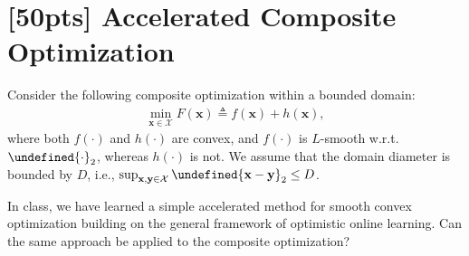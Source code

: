 \documentclass[a4paper]{article}
\numberwithin{equation}{section}
\theoremstyle{definition}
\theoremstyle{definition}
\def \X {\mathcal{X}}
\def \x {\textbf{x}}
\def \y {\textbf{y}}
\let\norm\undefined
\DeclarePairedDelimiter\norm{\lVert}{\rVert}
\begin{document}
\newpage
\section{[50pts] Accelerated Composite Optimization}

Consider the following composite optimization within a bounded domain:
\begin{align*}
  \min_{\x \in \X} F(\x) \triangleq f(\x) + h(\x),
\end{align*}
where both $f(\cdot)$ and $h(\cdot)$ are convex, and $f(\cdot)$ is $L$-smooth w.r.t. $\norm{\cdot}_2$, whereas $h(\cdot)$ is not. We assume that the domain diameter is bounded by $D$, i.e., $\sup_{\x, \y\in\X} \norm{\x - \y}_2 \leq D$.

In class, we have learned a simple accelerated method for smooth convex optimization building on the general framework of optimistic online learning. Can the same approach be applied to the composite optimization?
\end{document}
